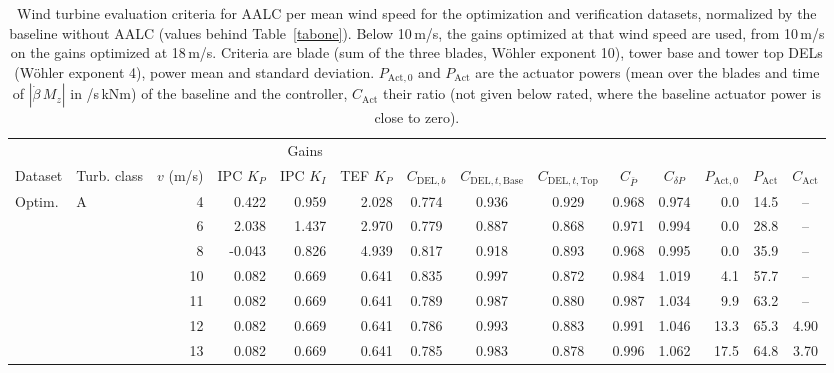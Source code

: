 \begin{table}[htbp]
    \centering
    \footnotesize
    \caption[Wind turbine evaluation criteria for AALC per wind speed]{\label{tab:AALC_windspeeds} Wind turbine evaluation criteria for AALC per mean wind speed for the optimization and verification datasets, normalized by the baseline without AALC (values behind Table~\ref{tabone}). Below 10\,m/s, the gains optimized at that wind speed are used, from 10\,m/s on the gains optimized at 18\,m/s. Criteria are blade (sum of the three blades, W\"ohler exponent 10), tower base and tower top DELs (W\"ohler exponent 4), power mean and standard deviation. $P_{\text{Act},0}$ and $P_{\text{Act}}$ are the actuator powers (mean over the blades and time of $|\dot\beta\, M_z|$ in \textdegree/s\,kNm) of the baseline and the controller, $C_{\text{Act}}$ their ratio (not given below rated, where the baseline actuator power is close to zero).}
    \begin{adjustbox}{max width=\textwidth}
    \begin{tabular}{@{}llr*{3}{r}*{5}{c}rrc@{}}
        \toprule
        & & & \multicolumn{3}{c}{Gains} & & & & & & & & \\
        \cmidrule(lr){4-6}
        Dataset & Turb. class & $v$ (m/s) & IPC $K_P$ & IPC $K_I$ & TEF $K_P$ & $C_{\text{DEL},b}$ & $C_{\text{DEL},t,\text{Base}}$ & $C_{\text{DEL},t,\text{Top}}$ & $C_{\bar{P}}$ & $C_{\delta P}$ & $P_{\text{Act},0}$ & $P_{\text{Act}}$ & $C_{\text{Act}}$ \\
        \midrule
        Optim. & A & 4 & 0.422 & 0.959 & 2.028 & 0.774 & 0.936 & 0.929 & 0.968 & 0.974 & 0.0 & 14.5 & -- \\
         &  & 6 & 2.038 & 1.437 & 2.970 & 0.779 & 0.887 & 0.868 & 0.971 & 0.994 & 0.0 & 28.8 & -- \\
         &  & 8 & -0.043 & 0.826 & 4.939 & 0.817 & 0.918 & 0.893 & 0.968 & 0.995 & 0.0 & 35.9 & -- \\
         &  & 10 & 0.082 & 0.669 & 0.641 & 0.835 & 0.997 & 0.872 & 0.984 & 1.019 & 4.1 & 57.7 & -- \\
         &  & 11 & 0.082 & 0.669 & 0.641 & 0.789 & 0.987 & 0.880 & 0.987 & 1.034 & 9.9 & 63.2 & -- \\
         &  & 12 & 0.082 & 0.669 & 0.641 & 0.786 & 0.993 & 0.883 & 0.991 & 1.046 & 13.3 & 65.3 & 4.90 \\
         &  & 13 & 0.082 & 0.669 & 0.641 & 0.785 & 0.983 & 0.878 & 0.996 & 1.062 & 17.5 & 64.8 & 3.70 \\

\end{tabular}
\end{adjustbox}
\end{table}
